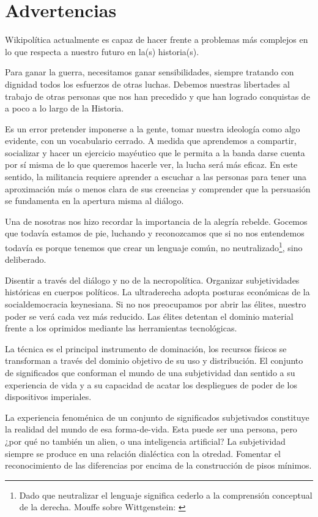 \hypertarget{advertencias}{%
\section{Advertencias}\label{advertencias}}

Wikipolítica actualmente es capaz de hacer frente a problemas más
complejos en lo que respecta a nuestro futuro en la(s) historia(s).

Para ganar la guerra, necesitamos ganar sensibilidades, siempre tratando
con dignidad todos los esfuerzos de otras luchas. Debemos nuestras
libertades al trabajo de otras personas que nos han precedido y que han
logrado conquistas de a poco a lo largo de la Historia.

Es un error pretender imponerse a la gente, tomar nuestra ideología como
algo evidente, con un vocabulario cerrado. A medida que aprendemos a
compartir, socializar y hacer un ejercicio mayéutico que le permita a la
banda darse cuenta por sí misma de lo que queremos hacerle ver, la lucha
será más eficaz. En este sentido, la militancia requiere aprender a
escuchar a las personas para tener una aproximación más o menos clara de
sus creencias y comprender que la persuasión se fundamenta en la
apertura misma al diálogo.

Una de nosotras nos hizo recordar la importancia de la alegría rebelde.
Gocemos que todavía estamos de pie, luchando y reconozcamos que si no
nos entendemos todavía es porque tenemos que crear un lenguaje común, no
neutralizado\footnote{Dado que neutralizar el lenguaje significa cederlo
  a la comprensión conceptual de la derecha. Mouffe sobre
  Wittgenstein: \cite{Mouffe2009}}, sino deliberado.

Disentir a través del diálogo y no de la necropolítica. Organizar
subjetividades históricas en cuerpos políticos. La ultraderecha adopta
posturas económicas de la socialdemocracia keynesiana. Si no nos
preocupamos por abrir las élites, nuestro poder se verá cada vez más
reducido. Las élites detentan el dominio material frente a los oprimidos
mediante las herramientas tecnológicas.

La técnica es el principal instrumento de dominación, los recursos
físicos se transforman a través del dominio objetivo de su uso y
distribución. El conjunto de significados que conforman el mundo de una
subjetividad dan sentido a su experiencia de vida y a su capacidad de
acatar los despliegues de poder de los dispositivos imperiales.

La experiencia fenoménica de un conjunto de significados subjetivados
constituye la realidad del mundo de esa forma-de-vida. Esta puede ser
una persona, pero ¿por qué no también un alien, o una inteligencia
artificial? La subjetividad siempre se produce en una relación
dialéctica con la otredad. Fomentar el reconocimiento de las diferencias
por encima de la construcción de pisos mínimos.

